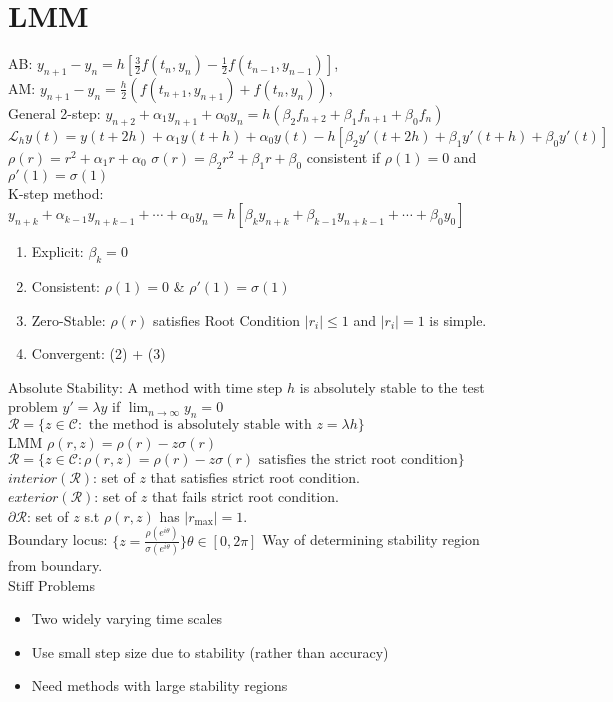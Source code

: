 \documentclass[10pt]{article}
\begin{document}
\section*{LMM}
AB\@: $y_{n+1}-y_n=h[\frac{3}{2}f(t_n,y_n)-\frac{1}{2}f(t_{n-1},y_{n-1})]$,\\ 
AM\@: $y_{n+1}-y_n=\frac{h}{2}(f(t_{n+1},y_{n+1})+f(t_n,y_n))$,\\ 
General 2-step\@: $y_{n+2}+\alpha_1y_{n+1}+\alpha_0y_n=h(\beta_2 f_{n+2}+\beta_1 f_{n+1}+\beta_0 f_n)$\\
$\mathscr{L}_h y(t)=y(t+2h)+\alpha_1y(t+h)+\alpha_0y(t)-h[\beta_2 y'(t+2h)+\beta_1 y'(t+h)+\beta_0 y'(t)]$\\
$\rho(r)=r^2+\alpha_1 r+\alpha_0$ $\sigma(r)=\beta_2r^2+\beta_1r+\beta_0$ consistent if $\rho(1)=0$ and $\rho'(1)=\sigma(1)$\\
K-step method\@: $y_{n+k}+\alpha_{k-1}y_{n+k-1}+\cdots+\alpha_0y_n=h[\beta_{k}y_{n+k}+\beta_{k-1}y_{n+k-1}+\cdots+\beta_0y_0]$
\begin{enumerate}
    \item Explicit\@: $\beta_k=0$
    \item Consistent\@: $\rho(1)=0$ \& $\rho'(1)=\sigma(1)$
    \item Zero-Stable\@: $\rho(r)$ satisfies Root Condition $\lvert r_i\rvert\le1$ and $\lvert r_i\rvert=1$ is simple.
    \item Convergent\@: (2) + (3)
\end{enumerate}
Absolute Stability\@: A method with time step $h$ is absolutely stable to the test problem $y'=\lambda y$ if $\lim_{n\rightarrow\infty}y_n=0$\\
$\mathscr{R}=\{z\in\mathcal{C}:\text{ the method is absolutely stable with }z=\lambda h\}$\\
LMM $\rho(r,z)=\rho(r)-z\sigma(r)$\\
$\mathscr{R}=\{z\in\mathcal{C}:\rho(r,z)=\rho(r)-z\sigma(r)\text{ satisfies the strict root condition}\}$\\
$interior(\mathscr{R})$\@: set of $z$ that satisfies strict root condition.\\ 
$exterior(\mathscr{R})$\@: set of $z$ that fails strict root condition.\\ 
$\partial\mathscr{R}$\@: set of $z$ s.t $\rho(r,z)$ has $\lvert r_{\max}\rvert=1$.\\
Boundary locus\@: $\{z=\frac{\rho(e^{i\theta})}{\sigma(e^{i\theta})}\}\theta\in[0,2\pi]$ Way of determining stability region from boundary.\\
Stiff Problems
\begin{itemize}
    \item Two widely varying time scales
    \item Use small step size due to stability (rather than accuracy)
    \item Need methods with large stability regions
\end{itemize}
\end{document}
